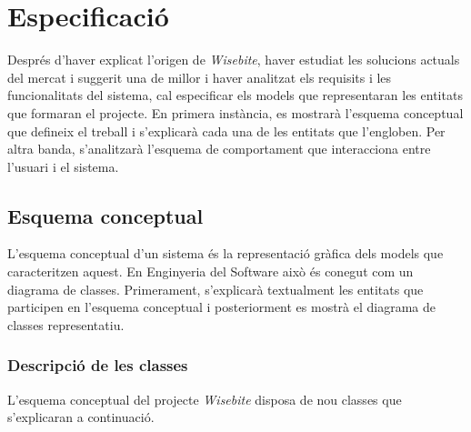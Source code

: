 
\chapter{Especificació} %

\label{Chapter5} %

Després d'haver explicat l'origen de \textit{Wisebite}, haver estudiat les solucions actuals del mercat i suggerit una de millor i haver analitzat els requisits i les funcionalitats del sistema, cal especificar els models que representaran les entitats que formaran el projecte. En primera instància, es mostrarà l'esquema conceptual que defineix el treball i s'explicarà cada una de les entitats que l'engloben. Per altra banda, s'analitzarà l'esquema de comportament que interacciona entre l'usuari i el sistema.


\section{Esquema conceptual}

L'esquema conceptual d'un sistema és la representació gràfica dels models que caracteritzen aquest. En Enginyeria del Software això és conegut com un diagrama de classes\cite{diagramaclases}. Primerament, s'explicarà textualment les entitats que participen en l'esquema conceptual i posteriorment es mostrà el diagrama de classes representatiu.

\subsection{Descripció de les classes}

L'esquema conceptual del projecte \textit{Wisebite} disposa de nou classes que s'explicaran a continuació.

